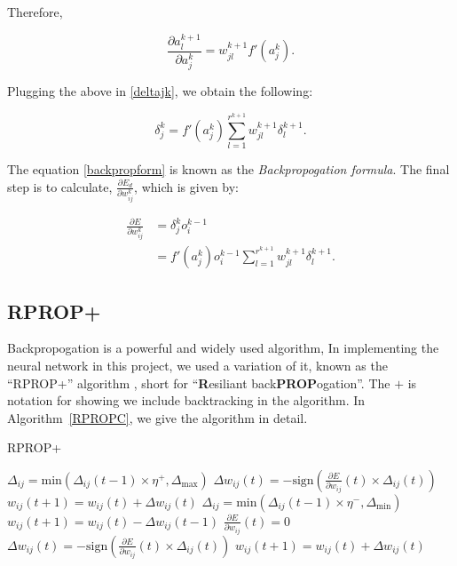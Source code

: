 Therefore,

\begin{equation}
    \frac{\partial a_l^{k+1}}{\partial a_j^k} = w_{jl}^{k+1}f'(a_j^k).
\end{equation}

Plugging the above in \ref{deltajk}, we obtain the following:

\begin{equation}
    \label{backpropform}
    \delta_j^k = f'(a_j^k)\sum^{r^{k+1}}_{l=1}w_{jl}^{k+1}\delta_l^{k+1}.
\end{equation}

The equation \ref{backpropform} is known as the \textit{Backpropogation formula}. The final step is to calculate, $\frac{\partial E_d}{\partial w_{ij}^k}$, which is given by:

\begin{align}
        \frac{\partial E}{\partial w_{ij}^k} &= \delta^k_jo_i^{k-1} \\
        &=f'(a_j^k)o^{k-1}_i \sum^{r^{k+1}}_{l=1}w_{jl}^{k+1}\delta_l^{k+1}.
\end{align}

\subsection{RPROP+}
Backpropogation is a powerful and widely used algorithm, In implementing the neural network in this project, we used a variation of it, known as 
the ``RPROP+'' algorithm \newline 
\cite{rprop}, short for ``\textbf{R}esiliant back\textbf{PROP}ogation''. The $+$ is notation for showing we include backtracking in the algorithm. In Algorithm~\ref{RPROPC}, 
we give the algorithm in detail. 

\begin{algorithm}[h]
    \caption{RPROP+}\label{RPROPC}
\begin{algorithmic}[1]
    \State $\Delta_{ij} = \text{min} (\Delta_{ij}(t-1)\times \eta^{+},\Delta_{\text{max}})$ 
    \State $\Delta w_{ij}(t) = -\text{sign}\left(\frac{\partial E}{\partial w_{ij}}(t) \times \Delta_{ij}(t)\right)$
    \State $w_{ij}(t+1) = w_{ij}(t) + \Delta w_{ij}(t)$
    \State $\Delta_{ij} = \text{min} (\Delta_{ij}(t-1)\times \eta^{-},\Delta_{\text{min}})$ 
    \State $w_{ij}(t+1) = w_{ij}(t) - \Delta w_{ij}(t-1)$
    \State $\frac{\partial E}{\partial w_{ij}}(t) = 0 $
    \State $\Delta w_{ij}(t) = -\text{sign}\left(\frac{\partial E}{\partial w_{ij}}(t) \times \Delta_{ij}(t)\right)$
    \State $w_{ij}(t+1) = w_{ij}(t) + \Delta w_{ij}(t)$
\EndIf
\EndFor
\end{algorithmic}   
\end{algorithm}

